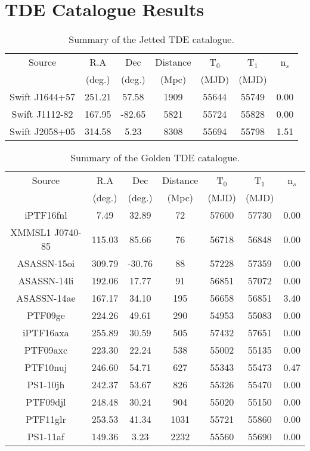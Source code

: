 \chapter{TDE Catalogue Results}
\label{ch:catalogues}

\begin{table*}[]
	\centering
	\begin{tabular}{|c | c c c | c c | c |} 
		\hline
		Source & R.A & Dec & Distance & T$_{0}$ & T$_{1}$ & n$_{s}$ \\
		& (deg.) & (deg.) & (Mpc) & (MJD) & (MJD) & \\
		\hline
		Swift J1644+57 & 251.21 & 57.58 & 1909 & 55644 & 55749  & 0.00 \\
		Swift J1112-82 & 167.95 & -82.65 & 5821 & 55724 & 55828  & 0.00 \\
		Swift J2058+05 & 314.58 & 5.23 & 8308 & 55694 & 55798  & 1.51 \\
		\hline
	\end{tabular}
	\caption{Summary of the Jetted TDE catalogue.}
	\label{tab:jetted_cat}
\end{table*}{}

\begin{table*}[]
	\centering
	\begin{tabular}{|c | c c c | c c | c |} 
		\hline
		Source & R.A & Dec & Distance & T$_{0}$ & T$_{1}$ & n$_{s}$ \\
		& (deg.) & (deg.) & (Mpc) & (MJD) & (MJD) & \\
		\hline
		iPTF16fnl & 7.49 & 32.89 & 72 & 57600 & 57730  & 0.00 \\
		XMMSL1 J0740-85 & 115.03 & 85.66 & 76 & 56718 & 56848  & 0.00 \\
		ASASSN-15oi & 309.79 & -30.76 & 88 & 57228 & 57359  & 0.00 \\
		ASASSN-14li & 192.06 & 17.77 & 91 & 56851 & 57072  & 0.00 \\
		ASASSN-14ae & 167.17 & 34.10 & 195 & 56658 & 56851  & 3.40 \\
		PTF09ge & 224.26 & 49.61 & 290 & 54953 & 55083  & 0.00 \\
		iPTF16axa & 255.89 & 30.59 & 505 & 57432 & 57651  & 0.00 \\
		PTF09axc & 223.30 & 22.24 & 538 & 55002 & 55135  & 0.00 \\
		PTF10nuj & 246.60 & 54.71 & 627 & 55343 & 55473  & 0.47 \\
		PS1-10jh & 242.37 & 53.67 & 826 & 55326 & 55470  & 0.00 \\
		PTF09djl & 248.48 & 30.24 & 904 & 55020 & 55150  & 0.00 \\
		PTF11glr & 253.53 & 41.34 & 1031 & 55721 & 55860  & 0.00 \\
		PS1-11af & 149.36 & 3.23 & 2232 & 55560 & 55690  & 0.00 \\
		\hline
	\end{tabular}
	\caption{Summary of the Golden TDE catalogue.}
	\label{tab:golden_cat}
\end{table*}{}

